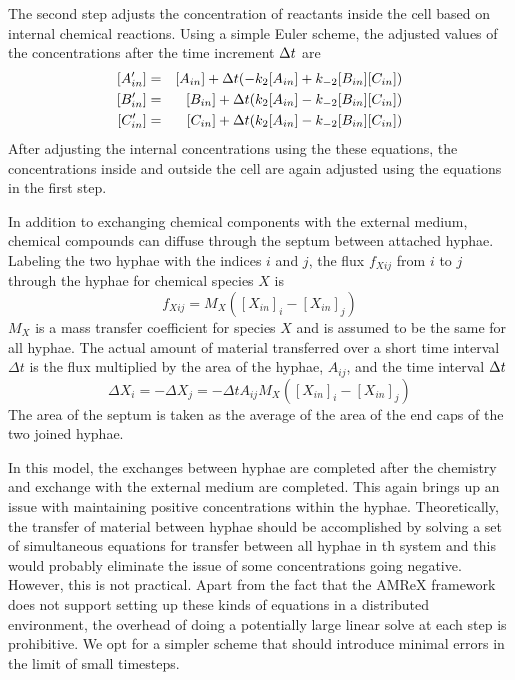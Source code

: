 \documentclass[12pt]{article}
\begin{document}
The second step adjusts the concentration of reactants inside the cell based on
internal chemical reactions. Using a simple Euler scheme, the adjusted values of
the concentrations after the time increment $\Delta t$ are
\begin{eqnarray}
\nonumber
[A'_{in}] &=& [A_{in}] + \Delta t(-k_2 [A_{in}] + k_{-2} [B_{in}][C_{in}]) \\
\nonumber
[B'_{in}] &=& [B_{in}] + \Delta t(k_2 [A_{in}] - k_{-2} [B_{in}][C_{in}]) \\
\nonumber
[C'_{in}] &=& [C_{in}] + \Delta t(k_2 [A_{in}] - k_{-2} [B_{in}][C_{in}])
\end{eqnarray}
After adjusting the internal concentrations using the these equations, the
concentrations inside and outside the cell are again adjusted using the
equations in the first step.

In addition to exchanging chemical components with the external medium, chemical compounds can
diffuse through the septum between attached hyphae. Labeling the two hyphae with the indices $i$
and $j$, the flux $f_{Xij}$ from $i$ to $j$ through the hyphae for chemical species $X$ is
\[
f_{Xij} = M_{X}([X_{in}]_i-[X_{in}]_j)
\]
$M_{X}$ is a mass transfer coefficient for species $X$ and is assumed to be the same for all
hyphae. The actual amount of material transferred over a short time interval $\Delta t$ is the
flux multiplied by the area of the hyphae, $A_{ij}$, and the time interval $\Delta t$
\[
\Delta X_i = -\Delta X_j = -\Delta t A_{ij} M_{X}([X_{in}]_i-[X_{in}]_j)
\]
The area of the septum is taken as the average of the area of the end caps of the two joined
hyphae.

In this model, the exchanges between hyphae are completed after the chemistry and exchange
with the external medium are completed. This again brings up an issue with maintaining positive
concentrations within the hyphae. Theoretically, the transfer of material between hyphae should
be accomplished by solving a set of simultaneous equations for transfer between all hyphae in th
system and this would probably eliminate the issue of some concentrations going negative.
However, this is not practical. Apart from the fact that the AMReX framework does not support
setting up these kinds of equations in a distributed environment, the overhead of doing a
potentially large linear solve at each step is prohibitive. We opt for a simpler scheme that
should introduce minimal errors in the limit of small timesteps.
\end{document}
